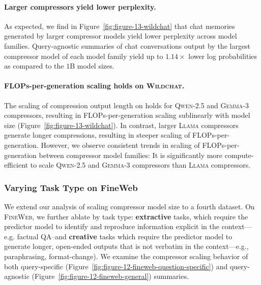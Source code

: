 \documentclass{article} %
\begin{document}
\paragraph*{Larger compressors yield lower perplexity.} As expected, we find in Figure~\ref{fig:figure-13-wildchat} that chat memories generated by larger compressor models yield lower perplexity across model families. Query-agnostic summaries of chat conversations output by the largest compressor model of each model family yield up to \(1.14\times\) lower log probabilities as compared to the \(1\)B model sizes. 

\paragraph*{FLOPs-per-generation scaling holds on \textsc{Wildchat}.} 
The scaling of compression output length on holds for \textsc{Qwen-2.5} and \textsc{Gemma-3} compressors, resulting in FLOPs-per-generation scaling sublinearly with model size (Figure~\ref{fig:figure-13-wildchat}). In contrast, larger \textsc{Llama} compressors generate longer compressions, resulting in steeper scaling of FLOPs-per-generation.  
However, we observe consistent trends in scaling of FLOPs-per-generation between compressor model families: It is significantly more compute-efficient to scale \textsc{Qwen-2.5} and \textsc{Gemma-3} compressors than \textsc{Llama} compressors.

\subsubsection{Varying Task Type on FineWeb}
\label{sec:fineweb-results-appendix}

We extend our analysis of scaling compressor model size to a fourth dataset. On \textsc{FineWeb}, we further ablate by task type: \textbf{extractive} tasks, which require the predictor model to identify and reproduce information explicit in the context---e.g. factual QA--and \textbf{creative} tasks which require the predictor model to generate longer, open-ended outputs that is not verbatim in the context---e.g., paraphrasing, format-change).
We examine the compressor scaling behavior of both query-specific (Figure~\ref{fig:figure-12-fineweb-question-specific}) and query-agnostic (Figure~\ref{fig:figure-12-fineweb-general}) summaries. 
\end{document}
